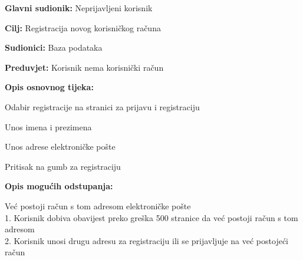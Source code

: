 					
					\noindent {}
					\begin{packed_item}
						\item \textbf{Glavni sudionik:} Neprijavljeni korisnik
						\item \textbf{Cilj:} Registracija novog korisničkog računa
						\item \textbf{Sudionici:} Baza podataka
						\item \textbf{Preduvjet:} Korisnik nema korisnički račun
						\item \textbf{Opis osnovnog tijeka:}
						\begin{packed_enum}
							\item Odabir registracije na stranici za prijavu i registraciju
							\item Unos imena i prezimena
							\item Unos adrese elektroničke pošte
							\item Pritisak na gumb za registraciju
						\end{packed_enum}
						\item \textbf{Opis mogućih odstupanja:}
						\begin{packed_item}
							\item[3.a] Već postoji račun s tom adresom elektroničke pošte
							\\1. Korisnik dobiva obavijest preko greška 500 stranice da već postoji račun s tom adresom
							\\2. Korisnik unosi drugu adresu za registraciju ili se prijavljuje na već postojeći račun
						\end{packed_item}
					\end{packed_item}
					
